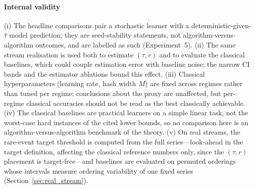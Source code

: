 \documentclass[sensors,article,submit,pdftex,moreauthors]{Definitions/mdpi}
\providecommand{\DIFadd}[1]{{\protect\color{blue}#1}} %
\providecommand{\DIFdel}[1]{} %
\providecommand{\DIFaddbegin}{} %
\providecommand{\DIFaddend}{} %
\providecommand{\DIFdelbegin}{} %
\providecommand{\DIFdelend}{} %
\begin{document}
\paragraph{\DIFadd{Internal validity}} \DIFadd{(i) The headline comparisons pair a stochastic learner with a deterministic-given-$\hat{\tau}$ model prediction; they are seed-stability statements, not algorithm-versus-algorithm outcomes, and are labelled as such (Experiment~5). (ii) The same stream realisation is used both to estimate $(\tau, r)$ and to evaluate the classical baselines, which could couple estimation error with baseline noise; the narrow CI bands and the estimator ablations bound this effect. (iii) Classical hyperparameters (learning rate, hash width $M$) are fixed across regimes rather than tuned per regime; conclusions about the proxy are unaffected, but per-regime classical accuracies should not be read as the best classically achievable. (iv) The classical baselines are practical }\DIFaddend learners on a simple linear \DIFdelbegin \DIFdel{classification task; they are }\DIFdelend \DIFaddbegin \DIFadd{task, }\DIFaddend not the worst-case \DIFdelbegin \DIFdel{task-specific instances that motivate the $\Omega(\sqrt{N})$ classical hardness reference, so the empirical comparison is not }\DIFdelend \DIFaddbegin \DIFadd{hard instances of the cited lower bounds, so no comparison here is }\DIFaddend an algorithm-versus-algorithm benchmark \DIFdelbegin \DIFdel{.
    }%
\textbf{\DIFdel{Real-stream evidence is a sanity check, not a domain-wide validation.}} %
\DIFdel{Two NAB datasets are examined }\DIFdelend \DIFaddbegin \DIFadd{of the theory. (v) On real streams, the rare-event target threshold is computed from the full series---look-ahead in the target definition, affecting the classical reference numbers only, since the $(\tau, r)$ placement is target-free---and baselines are evaluated on permuted orderings whose intervals measure ordering variability of one fixed series }\DIFaddend (Section~\ref{sec:real_stream})\DIFdelbegin \DIFdel{; broader }\DIFdelend \DIFaddbegin \DIFadd{.
}
\end{document}
